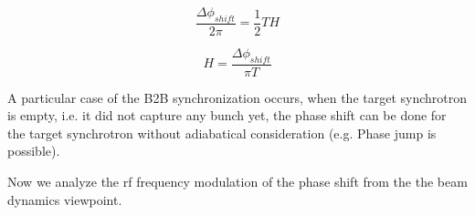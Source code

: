 \begin{equation}
\frac{\Delta \phi_{shift}}{2\pi}=\frac{1}{2}TH \label{area}
\end{equation}

\begin{equation}
H= \frac{\Delta \phi_{shift}}{\pi T}\label{height}
\end{equation}

A particular case of the B2B synchronization occurs, when the target synchrotron is empty, i.e. it did not capture any bunch yet, the phase shift can be done for the target synchrotron without adiabatical consideration (e.g. Phase jump is possible).

Now we analyze the rf frequency modulation of the phase shift from the the beam dynamics viewpoint.
